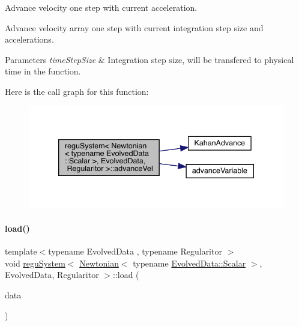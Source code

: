Advance velocity one step with current acceleration. 

Advance velocity array one step with current integration step size and accelerations. 
\begin{DoxyParams}{Parameters}
{\em time\+Step\+Size} & Integration step size, will be transfered to physical time in the function. \\
\hline
\end{DoxyParams}
Here is the call graph for this function\+:\nopagebreak
\begin{figure}[H]
\begin{center}
\leavevmode
\includegraphics[width=339pt]{classregu_system_3_01_newtonian_3_01typename_01_evolved_data_1_1_scalar_01_4_00_01_evolved_data_00_01_regularitor_01_4_a04de03e59e9369cae79251b8ab876c2c_cgraph}
\end{center}
\end{figure}
\mbox{\label{classregu_system_3_01_newtonian_3_01typename_01_evolved_data_1_1_scalar_01_4_00_01_evolved_data_00_01_regularitor_01_4_a968643b9deaa2a579a025652238fdc75}} 
\paragraph{\texorpdfstring{load()}{load()}}
{\footnotesize\ttfamily template$<$typename Evolved\+Data , typename Regularitor $>$ \\
void \mbox{\hyperlink{classregu_system}{regu\+System}}$<$ \mbox{\hyperlink{class_newtonian}{Newtonian}}$<$ typename \mbox{\hyperlink{classregu_system_aca8ee2c387943164ee3ea68370fc3ac0}{Evolved\+Data\+::\+Scalar}} $>$, Evolved\+Data, Regularitor $>$\+::load (\begin{DoxyParamCaption}\item[{\mbox{\hyperlink{classregu_system_3_01_newtonian_3_01typename_01_evolved_data_1_1_scalar_01_4_00_01_evolved_data_00_01_regularitor_01_4_a26da8a1ed92e5aced3615da524ef37b3}{Plain\+Array}} \&}]{data }\end{DoxyParamCaption})}



